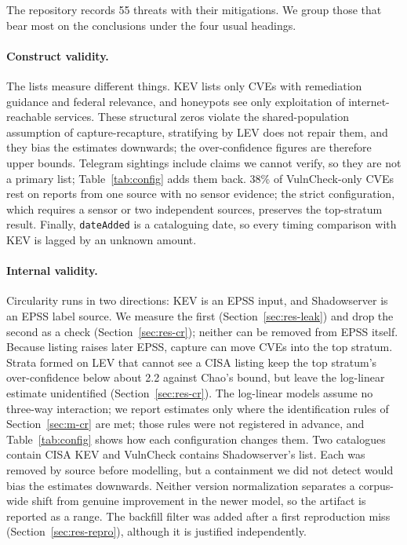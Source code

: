 The repository records 55 threats with their mitigations. We group
those that bear most on the conclusions under the four usual headings.

\paragraph{Construct validity.} The lists measure different things. KEV lists
only CVEs with remediation guidance and federal relevance, and honeypots see
only exploitation of internet-reachable services. These structural zeros violate
the shared-population assumption of capture-recapture, stratifying by LEV does
not repair them, and they bias the estimates downwards; the over-confidence
figures are therefore upper bounds. Telegram sightings include claims we cannot
verify, so they are not a primary list; Table~\ref{tab:config} adds them back. 38\%
of VulnCheck-only CVEs rest on reports from one source with no sensor evidence;
the strict configuration, which requires a sensor or two independent sources,
preserves the top-stratum result.
Finally, \texttt{dateAdded} is a cataloguing date, so every timing comparison
with KEV is lagged by an unknown amount.

\paragraph{Internal validity.} Circularity runs in two directions: KEV is an
EPSS input, and Shadowserver is an EPSS label source. We measure the first
(Section~\ref{sec:res-leak}) and drop the second as a check
(Section~\ref{sec:res-cr}); neither can be removed from EPSS itself. Because
listing raises later EPSS, capture can move CVEs into the top stratum. Strata
formed on LEV that cannot see a CISA listing keep the top stratum's
over-confidence below about 2.2 against Chao's bound, but leave the log-linear
estimate unidentified (Section~\ref{sec:res-cr}).
The log-linear models assume no three-way interaction; we report estimates only
where the identification rules of Section~\ref{sec:m-cr} are met; those rules
were not registered in advance, and Table~\ref{tab:config} shows
how each configuration changes them. Two catalogues contain CISA KEV and
VulnCheck contains Shadowserver's list. Each was removed by source before
modelling, but a containment we did not detect would bias the estimates
downwards. Neither version normalization separates a corpus-wide shift from
genuine improvement in the newer model, so the artifact is reported as a range.
The backfill filter was added after a first reproduction miss
(Section~\ref{sec:res-repro}), although it is justified independently.

